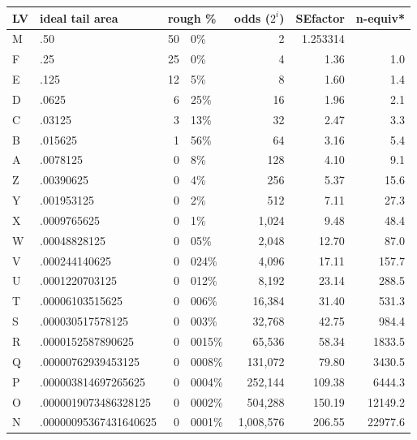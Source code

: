 \documentclass[12pt,oneside]{article}
\begin{document}
\begin{table}[htpb]
  \centering
  \begin{tabular}{llr@{.}lrrr}
  \toprule
  LV & ideal tail area & \multicolumn{2}{l}{rough \%} & odds ($2^i$) & SEfactor & n-equiv*  \\
  \midrule
   M & .50 & 50 & 0\% & 2 & 1.253314 & \\
   F & .25 & 25 & 0\% & 4 & 1.36 & 1.0\\
   E & .125 & 12 & 5\% & 8 & 1.60 & 1.4\\
   D & .0625 & 6 & 25\% & 16 & 1.96 & 2.1\\
   C & .03125 & 3 & 13\% & 32 & 2.47 & 3.3\\
   B & .015625 & 1 & 56\% & 64 & 3.16 & 5.4\\
   A & .0078125 & 0 & 8\% & 128 & 4.10 & 9.1\\
   Z & .00390625 & 0 & 4\% & 256 & 5.37 & 15.6\\
   Y & .001953125 & 0 & 2\% & 512 & 7.11 & 27.3\\
   X & .0009765625 & 0 & 1\% & 1,024 & 9.48 & 48.4\\
   W & .00048828125 & 0 & 05\% & 2,048 & 12.70 & 87.0\\
   V & .000244140625 & 0 & 024\% & 4,096 & 17.11 & 157.7\\
   U & .0001220703125 & 0 & 012\% & 8,192 & 23.14 & 288.5\\
   T & .00006103515625 & 0 & 006\% & 16,384 & 31.40 & 531.3\\
   S & .000030517578125 & 0 & 003\% & 32,768 & 42.75 & 984.4\\
   R & .0000152587890625 & 0 & 0015\% & 65,536 & 58.34 & 1833.5\\
   Q & .00000762939453125 & 0 & 0008\% & 131,072 & 79.80 & 3430.5\\
   P & .000003814697265625 & 0 & 0004\% & 252,144 & 109.38 & 6444.3\\
   O & .0000019073486328125 & 0 & 0002\% & 504,288 & 150.19 & 12149.2\\
   N & .00000095367431640625 & 0 & 0001\% & 1,008,576 & 206.55 & 22977.6\\
  \bottomrule
  \end{tabular}


\end{table}
\end{document}
